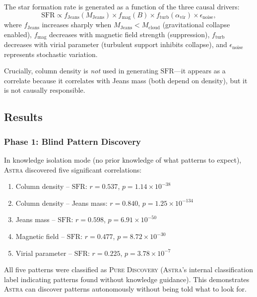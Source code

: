 \documentclass[fleqn,usenatbib]{mnras}
\newcommand{\astra}{\textsc{Astra}\xspace}
\newcommand{\sfr}{\mathrm{SFR}}
\begin{document}
The star formation rate is generated as a function of the three causal drivers:
\begin{equation}
  \sfr \propto f_{\mathrm{Jeans}}(M_{\mathrm{Jeans}}) \times f_{\mathrm{mag}}(B) \times f_{\mathrm{turb}}(\alpha_{\mathrm{vir}}) \times \epsilon_{\mathrm{noise}},
  \label{eq:sfr_model}
\end{equation}
where $f_{\mathrm{Jeans}}$ increases sharply when $M_{\mathrm{Jeans}} < M_{\mathrm{cloud}}$ (gravitational collapse enabled), $f_{\mathrm{mag}}$ decreases with magnetic field strength (suppression), $f_{\mathrm{turb}}$ decreases with virial parameter (turbulent support inhibits collapse), and $\epsilon_{\mathrm{noise}}$ represents stochastic variation.

Crucially, column density is \emph{not} used in generating $\sfr$---it appears as a correlate because it correlates with Jeans mass (both depend on density), but it is not causally responsible.

\subsection{Results}
\label{sec:tc6:results}

\subsubsection{Phase 1: Blind Pattern Discovery}
\label{sec:tc6:phase1}

In knowledge isolation mode (no prior knowledge of what patterns to expect), \astra discovered five significant correlations:
\begin{enumerate}
  \item[(i)] Column density -- $\sfr$: $r = 0.537$, $p = 1.14 \times 10^{-38}$
  \item[(ii)] Column density -- Jeans mass: $r = 0.840$, $p = 1.25 \times 10^{-134}$
  \item[(iii)] Jeans mass -- $\sfr$: $r = 0.598$, $p = 6.91 \times 10^{-50}$
  \item[(iv)] Magnetic field -- $\sfr$: $r = 0.477$, $p = 8.72 \times 10^{-30}$
  \item[(v)] Virial parameter -- $\sfr$: $r = 0.225$, $p = 3.78 \times 10^{-7}$
\end{enumerate}

All five patterns were classified as \textsc{Pure Discovery} (\astra's internal classification label indicating patterns found without knowledge guidance).
This demonstrates \astra can discover patterns autonomously without being told what to look for.
\end{document}
